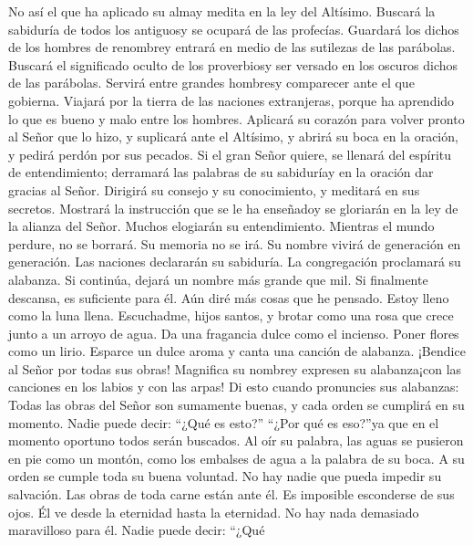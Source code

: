  No así el que ha aplicado su almay medita en la ley del
Altísimo. Buscará la sabiduría de todos los antiguosy se ocupará de las
profecías.  Guardará los dichos de los hombres de
renombrey entrará en medio de las sutilezas de las parábolas.
 Buscará el significado oculto de los proverbiosy ser
versado en los oscuros dichos de las parábolas.  Servirá
entre grandes hombresy comparecer ante el que gobierna. Viajará por la
tierra de las naciones extranjeras, porque ha aprendido lo que es bueno
y malo entre los hombres.  Aplicará su corazón para volver
pronto al Señor que lo hizo, y suplicará ante el Altísimo, y abrirá su
boca en la oración, y pedirá perdón por sus pecados.  Si
el gran Señor quiere, se llenará del espíritu de entendimiento;
derramará las palabras de su sabiduríay en la oración dar gracias al
Señor.  Dirigirá su consejo y su conocimiento, y meditará
en sus secretos.  Mostrará la instrucción que se le ha
enseñadoy se gloriarán en la ley de la alianza del Señor. 
Muchos elogiarán su entendimiento. Mientras el mundo perdure, no se
borrará. Su memoria no se irá. Su nombre vivirá de generación en
generación.  Las naciones declararán su sabiduría. La
congregación proclamará su alabanza.  Si continúa, dejará
un nombre más grande que mil. Si finalmente descansa, es suficiente para
él.  Aún diré más cosas que he pensado. Estoy lleno como
la luna llena.  Escuchadme, hijos santos, y brotar como
una rosa que crece junto a un arroyo de agua.  Da una
fragancia dulce como el incienso. Poner flores como un lirio. Esparce un
dulce aroma y canta una canción de alabanza. ¡Bendice al Señor por todas
sus obras!  Magnifica su nombrey expresen su alabanza¡con
las canciones en los labios y con las arpas! Di esto cuando pronuncies
sus alabanzas:  Todas las obras del Señor son sumamente
buenas, y cada orden se cumplirá en su momento.  Nadie
puede decir: ``¿Qué es esto?'' ``¿Por qué es eso?''ya que en el momento
oportuno todos serán buscados. Al oír su palabra, las aguas se pusieron
en pie como un montón, como los embalses de agua a la palabra de su
boca.  A su orden se cumple toda su buena voluntad. No
hay nadie que pueda impedir su salvación.  Las obras de
toda carne están ante él. Es imposible esconderse de sus ojos.
 Él ve desde la eternidad hasta la eternidad. No hay nada
demasiado maravilloso para él.  Nadie puede decir: ``¿Qué
